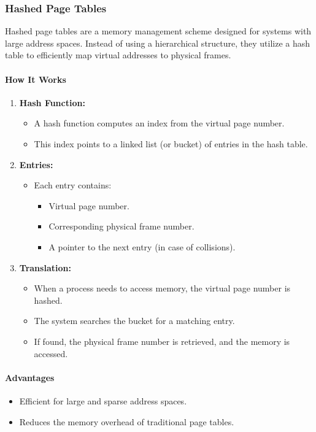 \documentclass{article}
\begin{document}
\subsubsection{Hashed Page Tables}

Hashed page tables are a memory management scheme designed for systems with large address spaces. Instead of using a hierarchical structure, they utilize a hash table to efficiently map virtual addresses to physical frames.

\paragraph{How It Works}
\begin{enumerate}
    \item \textbf{Hash Function:}
    \begin{itemize}
        \item A hash function computes an index from the virtual page number.
        \item This index points to a linked list (or bucket) of entries in the hash table.
    \end{itemize}

    \item \textbf{Entries:}
    \begin{itemize}
        \item Each entry contains:
        \begin{itemize}
            \item Virtual page number.
            \item Corresponding physical frame number.
            \item A pointer to the next entry (in case of collisions).
        \end{itemize}
    \end{itemize}

    \item \textbf{Translation:}
    \begin{itemize}
        \item When a process needs to access memory, the virtual page number is hashed.
        \item The system searches the bucket for a matching entry.
        \item If found, the physical frame number is retrieved, and the memory is accessed.
    \end{itemize}
\end{enumerate}

\paragraph{Advantages}
\begin{itemize}
    \item Efficient for large and sparse address spaces.
    \item Reduces the memory overhead of traditional page tables.
\end{itemize}
\end{document}
